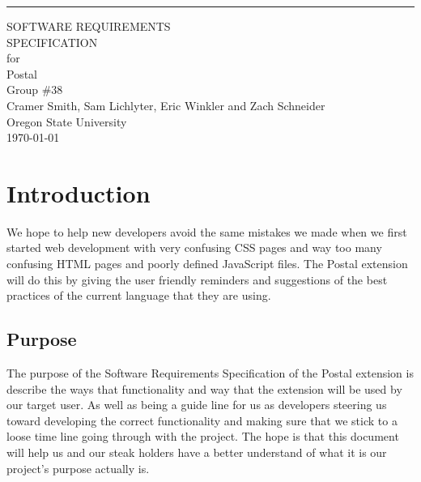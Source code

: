 \documentclass[letterpaper,10pt,titlepage,draftclsnofoot,onecolumn] {IEEEtran}
\date{}
\begin{document}
\begin{flushright}
    \rule{16cm}{5pt}\vskip1cm
    \begin{bfseries}
        \Huge{SOFTWARE REQUIREMENTS\\ SPECIFICATION}\\
        \vspace{1cm}
        for\\
        \vspace{1cm}
        Postal\\
        \vspace{.5cm}
        Group \#38\\
        \vspace{1.9cm}
        Cramer Smith, Sam Lichlyter, Eric Winkler and Zach Schneider\\
        \vspace{1.9cm}
        Oregon State University\\
        \vspace{1.9cm}
        \today\\
    \end{bfseries}
\end{flushright}

\tableofcontents

\section{Introduction}

We hope to help new developers avoid the same mistakes we made when we first started web development with very confusing CSS pages and way too many confusing HTML pages and poorly defined JavaScript files. 
The Postal extension will do this by giving the user friendly reminders and suggestions of the best practices of the current language that they are using.

\subsection{Purpose}
The purpose of the Software Requirements Specification of the Postal extension is describe the ways that functionality and way that the extension will be used by our target user. 
As well as being a guide line for us as developers steering us toward developing the correct functionality and making sure that we stick to a loose time line going through with the project.
The hope is that this document will help us and our steak holders have a better understand of what it is our project's purpose actually is.
\end{document}
